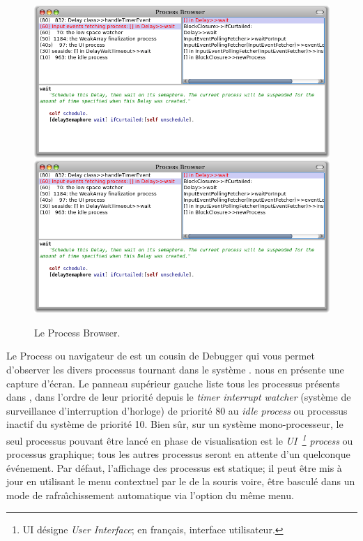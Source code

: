 \documentclass[a4paper,10pt,twoside]{book}
\begin{document}
\begin{figure}[btp]
	\begin{center}
	\ifluluelse
		{\includegraphics[width=\textwidth]{processBrowser}}
		{\includegraphics[scale=0.7]{processBrowser}}
	\end{center}
	\caption{Le Process Browser.}
	\label{fig:processBrowser}
\end{figure}

Le Process  ou navigateur de  
est un cousin de Debugger qui vous permet d'observer les divers processus tournant
dans le syst\`eme \pharo.
 nous en pr\'esente une capture d'\'ecran.
Le panneau sup\'erieur gauche liste tous les processus pr\'esents dans \pharo, 
dans l'ordre de leur priorit\'e depuis le \emph{timer interrupt watcher} 
(syst\`eme de surveillance d'interruption d'horloge) de priorit\'e
80 au \emph{idle process} ou processus inactif du syst\`eme de priorit\'e 10.
Bien s\^ur, sur un syst\`eme mono-processeur, le seul processus pouvant \^etre 
lanc\'e en phase de visualisation est le \emph{UI~\footnote{UI d\'esigne 
\emph{User Interface}; en fran\c{c}ais, interface utilisateur.} process} 
ou processus graphique;
tous les autres processus seront en attente d'un quelconque \'ev\'enement.
Par d\'efaut, l'affichage des processus est statique; il peut \^etre mis \`a jour
en utilisant le menu contextuel par le  de la souris voire,
\^etre bascul\'e dans un mode de rafra\^{\i}chissement automatique
via l'option  du m\^eme menu.
\end{document}
